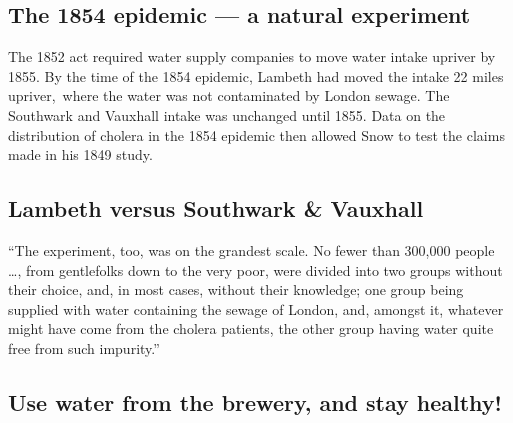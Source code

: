 \documentclass[
  10pt,
  b5paper]{book}
\begin{document}
\hypertarget{the-1854-epidemic-a-natural-experiment}{%
\subsection*{The 1854 epidemic --- a natural experiment}\label{the-1854-epidemic-a-natural-experiment}}

The 1852 act required water supply companies to move water intake
upriver by 1855. By the time of the 1854 epidemic, Lambeth had
moved the intake 22 miles upriver,~where the water was not
contaminated by London sewage. The Southwark and Vauxhall intake
was unchanged until 1855. Data on the distribution of cholera in
the 1854 epidemic then allowed Snow to test the claims made in his
1849 study.

\hypertarget{lambeth-versus-southwark-vauxhall}{%
\subsection*{Lambeth versus Southwark \& Vauxhall}\label{lambeth-versus-southwark-vauxhall}}


``The experiment, too, was on the grandest scale. No fewer than 300,000 people \ldots, from gentlefolks down to the very poor, were divided into two groups without their choice, and, in most cases, without their knowledge; one group being supplied with water containing the sewage of London, and, amongst it, whatever might have come from the cholera patients, the other group having water quite free from such impurity.''

\hypertarget{use-water-from-the-brewery-and-stay-healthy}{%
\subsection*{Use water from the brewery, and stay healthy!}\label{use-water-from-the-brewery-and-stay-healthy}}
\end{document}
